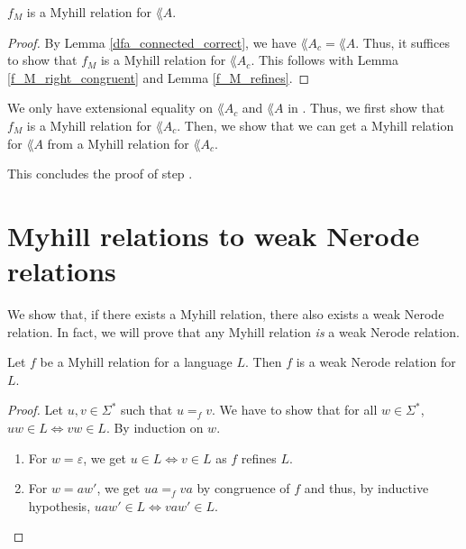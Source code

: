 \begin{theorem}
    \label{dfa_to_myhill}
    $f_M$ is a Myhill relation for $\lang{A}$.
\end{theorem}
\begin{proof}
    By Lemma \ref{dfa_connected_correct}, we have $\lang{A_c} = \lang{A}$.
    Thus, it suffices to show that $f_M$ is a Myhill relation for $\lang{A_c}$.
    This follows with Lemma \ref{f_M_right_congruent} and Lemma \ref{f_M_refines}.
\end{proof}


We only have extensional equality on $\lang{A_c}$ and $\lang{A}$ in \coq.
Thus, we first show that $f_M$ is a Myhill relation for $\lang{A_c}$.
Then, we show that we can get a Myhill relation for $\lang{A}$ from a Myhill relation for $\lang{A_c}$.



This concludes the proof of step .

\section{Myhill relations to weak Nerode relations}
We show that, if there exists a Myhill relation, there also exists a weak Nerode relation.
In fact, we will prove that any Myhill relation \textit{is} a weak Nerode relation.

\begin{theorem}
    \label{myhill_to_weak_nerode}
    Let $f$ be a Myhill relation for a language $L$.
    Then $f$ is a weak Nerode relation for $L$.
\end{theorem}
\begin{proof}
    Let $u, v \in \Sigma^*$ such that $u =_f v$. We have to show that for all $w \in \Sigma^*$, $u w \in L \Leftrightarrow v w \in L$.
    By induction on $w$.
    \begin{enumerate}
        \item For $w = \varepsilon$, we get $u \in L \Leftrightarrow v \in L$ as $f$ refines $L$.
        \item For $w = aw'$, we get $ua =_f va$ by congruence of $f$ and thus, by inductive hypothesis, $uaw' \in L \Leftrightarrow vaw' \in L$.
    \end{enumerate}
\end{proof}



